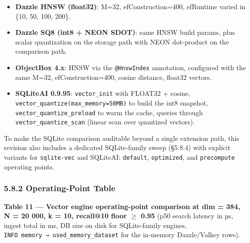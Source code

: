 \begin{itemize}
\tightlist
\item
  \textbf{Dazzle HNSW (float32)}: M=32, efConstruction=400, efRuntime varied in
  \{10, 50, 100, 200\}.
\item
  \textbf{Dazzle SQ8 (int8 + NEON SDOT)}: same HNSW build params, plus scalar
  quantization on the storage path with NEON dot-product on the comparison path.
\item
  \textbf{ObjectBox 4.x}: HNSW via the \texttt{@HnswIndex} annotation,
  configured with the same M=32, efConstruction=400, cosine distance, float32
  vectors.
\item
  \textbf{SQLiteAI 0.9.95}: \texttt{vector\_init} with FLOAT32 + cosine,
  \texttt{vector\_quantize(max\_memory=50MB)} to build the int8 snapshot,
  \texttt{vector\_quantize\_preload} to warm the cache, queries through
  \texttt{vector\_quantize\_scan} (linear scan over quantized vectors).
\end{itemize}

To make the SQLite comparison auditable beyond a single extension path, this
revision also includes a dedicated SQLite-family sweep (§5.8.4) with explicit
variants for \texttt{sqlite-vec} and SQLiteAI: \texttt{default},
\texttt{optimized}, and \texttt{precompute} operating points.

\subsubsection{5.8.2 Operating-Point Table}\label{operating-point-table}

\textbf{Table 11 --- Vector engine operating-point comparison at dim = 384, N =
20 000, k = 10, recall@10 floor \(\geq\) 0.95} (p50 search latency in µs, ingest
total in ms, DB size on disk for SQLite-family engines,
\texttt{INFO\ memory\ →\ used\_memory\_dataset} for the in-memory Dazzle/Valkey
rows).

